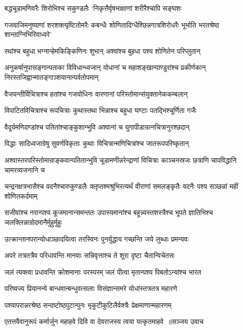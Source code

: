 \twolineshloka
{बद्धचूडामणिवरैः शिरोभिश्च सकुण्डलैः}
{`निकृत्तैर्वृषभाक्षाणां शरीरैश्चापि सङ्घशः}


\threelineshloka
{गजवाजिमनुष्याणां शरशक्त्यृष्टितोमरैः}
{कबन्धैः शोणितादिग्धैश्छिन्नगात्रशिरोधरैः}
{भूर्भाति भरतश्रेष्ठ शान्ताग्निभिरिवाध्वरे'}


\twolineshloka
{रथांश्च बहुधा भग्नान्हेमकिङ्किणिनः शुभान्}
{अश्वांश्च बुहधा पश्य शोणितेन परिप्लुतान्}


\threelineshloka
{अनुकर्षानुपासङ्गान्पताका विविधान्ध्वजान्}
{योधानां च महाशङ्खान्पाण्डुरांश्च प्रकीर्णकान्}
{निरस्तजिह्वान्मातङ्गाञ्शयानान्पर्वतोपमान्}


\twolineshloka
{वैजयन्तीर्विचित्राश्च हतांश्च गजयोधिनः}
{वारणानां परिस्तोमान्संयुक्तानेककम्बलान्}


\twolineshloka
{विपाटितविचित्राश्च रूपचित्राः कुथास्तथा}
{भिन्नाश्च बहुधा घण्टाः पतद्भिश्चूर्णिता गजैः}


\twolineshloka
{वैदूर्यमणिदण्डांश्च पतितांश्चाङ्कुशान्भुवि}
{अश्वानां च युगापीडान्रत्नचित्रानुरश्छदान्}


\twolineshloka
{विद्धाः सादिध्वजाग्रेषु सुवर्णविकृताः कुथाः}
{विचित्रान्मणिचित्रांश्च जातरूपपरिष्कृतान्}


\threelineshloka
{अश्वास्तरपरिस्तोमान्राङ्कवान्पतितान्भुवि}
{चूडामणीन्नरेन्द्राणां विचित्राः काञ्चनस्रजः}
{छत्राणि चापविद्धानि चामरव्यजनानि च}


\threelineshloka
{चन्द्रनक्षत्रभासैश्च वदनैश्चारुकुण्डलैः}
{क्लृप्तश्मश्रुभिरत्यर्थं वीराणां समलङ्कृतैः}
{वदनैः पश्य सञ्छन्नां महीं शोणितकर्दमाम्}


\threelineshloka
{सजीवांश्च नरान्पश्य कूजमानान्समन्ततः}
{उपास्यमानांश्च बहून्न्यस्तशस्त्रैश्च भूपते}
{ज्ञातिभिश्च जलक्लिन्नान्रोदमानैर्मुहुर्मुहुः}


\twolineshloka
{उत्क्रान्तानपरान्योधाञ्छादयित्वा तरस्विनः}
{पुनर्युद्धाय गच्छन्ति जये लुब्धाः प्रमन्यवः}


\twolineshloka
{अपरे तत्रतत्रैव परिधावन्ति मानवाः}
{सन्निवृत्ताश्च ते शूरा दृष्टा चैतान्विचेतसः}


\twolineshloka
{जलं त्यक्त्वा प्रधावन्ति क्रोशमानाः परस्परम्}
{जलं पीत्वा मृतान्पश्य पिबतोऽन्यांश्च भारत}


\twolineshloka
{परिष्वज्य प्रियानन्ये बान्धवान्बन्धुवत्सलाः}
{विसंज्ञान्समरे योधांस्तत्रतत्र महारणे}


\twolineshloka
{पश्यापरान्नरश्रेष्ठ सन्दष्टोष्ठपुटान्पुनः}
{भृकुटीकुटिलैर्वक्त्रैः प्रेक्षमाणान्महारणम्}


\threelineshloka
{एतत्तवैवानुरूपं कर्मार्जुन महाहवे}
{दिवि वा देवराजस्य त्वया यत्कृतमाहवे ॥सञ्जय उवाच}
{}



